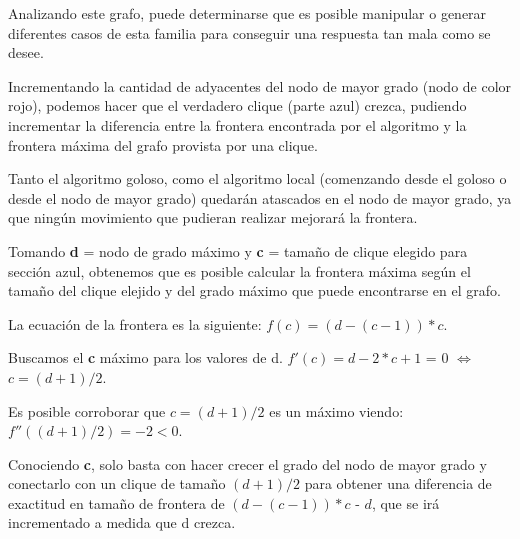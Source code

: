 Analizando este grafo, puede determinarse que es posible manipular o generar diferentes casos de esta familia para conseguir una respuesta tan mala como se desee.

Incrementando la cantidad de adyacentes del nodo de mayor grado (nodo de color rojo), podemos hacer que el verdadero clique (parte azul) crezca, pudiendo incrementar la diferencia entre la frontera encontrada por el algoritmo y la frontera máxima del grafo provista por una clique.

Tanto el algoritmo goloso, como el algoritmo local (comenzando desde el goloso o desde el nodo de mayor grado) quedarán atascados en el nodo de mayor grado, ya que ningún movimiento que pudieran realizar mejorará la frontera.

Tomando \textbf{d} = nodo de grado máximo y \textbf{c} = tamaño de clique elegido para sección azul, obtenemos que es posible calcular la frontera máxima según el tamaño del clique elejido y del grado máximo que puede encontrarse en el grafo.

La ecuación de la frontera es la siguiente: $f(c) = (d - (c - 1)) * c$.

Buscamos el \textbf{c} máximo para los valores de d. $f'(c) = d - 2 * c + 1$ = 0 $\Leftrightarrow$ $c = (d + 1)/2$.

Es posible corroborar que $c = (d + 1)/2$ es un máximo viendo: $f''((d + 1)/2) = -2 < 0$.

Conociendo \textbf{c}, solo basta con hacer crecer el grado del nodo de mayor grado y conectarlo con un clique de tamaño $(d + 1)/2$ para obtener una diferencia de exactitud en tamaño de frontera de $(d - (c - 1)) * c$ - $d$, que se irá incrementado a medida que d crezca.